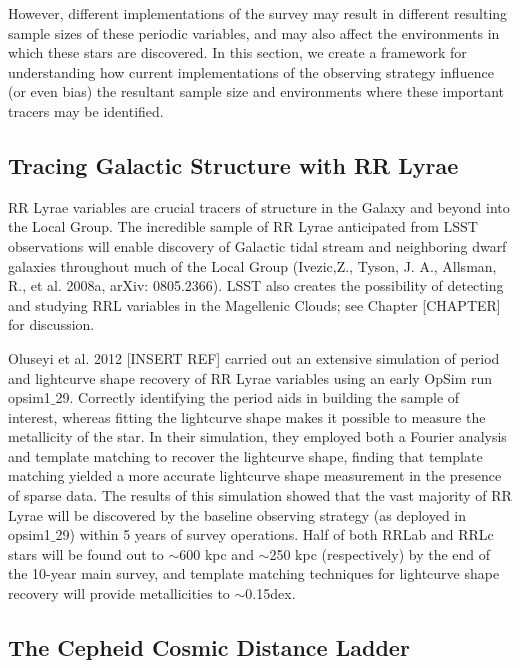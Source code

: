 However, different implementations of the survey may result in different resulting sample sizes of these periodic variables, and may also affect the environments in which these stars are discovered. In this section, we create a framework for understanding how current implementations of the observing strategy influence (or even bias) the resultant sample size and environments where these important tracers may be identified. 

\subsection{Tracing Galactic Structure with RR Lyrae}

RR Lyrae variables are crucial tracers of structure in the Galaxy and beyond into the Local Group. The incredible sample of RR Lyrae anticipated from LSST observations will enable discovery of Galactic tidal stream and neighboring dwarf galaxies throughout much of the Local Group (Ivezic,Z., Tyson, J. A., Allsman, R., et al. 2008a, arXiv: 0805.2366). LSST also creates the possibility of detecting and studying RRL variables in the Magellenic Clouds; see Chapter [CHAPTER] for discussion.

Oluseyi et al. 2012 [INSERT REF] carried out an extensive simulation of period and lightcurve shape recovery of RR Lyrae variables using an early OpSim run opsim1$\_$29. Correctly identifying the period aids in building the sample of interest, whereas fitting the lightcurve shape makes it possible to measure the metallicity of the star. In their simulation, they employed both a Fourier analysis and template matching to recover the lightcurve shape, finding that template matching yielded a more accurate lightcurve shape measurement in the presence of sparse data. The results of this simulation showed that the vast majority of RR Lyrae will be discovered by the baseline observing strategy (as deployed in opsim1$\_$29) within 5 years of survey operations. Half of both RRLab and RRLc stars will be found out to $\sim$600 kpc and $\sim$250 kpc (respectively) by the end of the 10-year main survey, and template matching techniques for lightcurve shape recovery will provide metallicities to $\sim$0.15dex. 


\subsection{The Cepheid Cosmic Distance Ladder}

